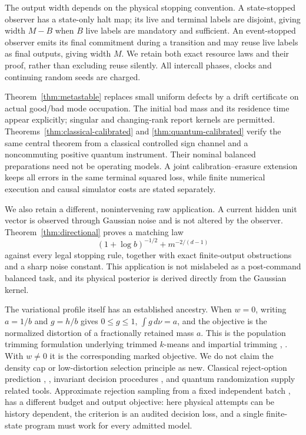 The output width depends on the physical stopping convention. A state-stopped observer has a state-only halt map; its live and terminal labels are disjoint, giving width $M-B$ when $B$ live labels are mandatory and sufficient. An event-stopped observer emits its final commitment during a transition and may reuse live labels as final outputs, giving width $M$. We retain both exact resource laws and their proof, rather than excluding reuse silently. All intercall phases, clocks and continuing random seeds are charged.

Theorem~\ref{thm:metastable} replaces small uniform defects by a drift certificate on actual good/bad mode occupation. The initial bad mass and its residence time appear explicitly; singular and changing-rank report kernels are permitted. Theorems~\ref{thm:classical-calibrated} and \ref{thm:quantum-calibrated} verify the same central theorem from a classical controlled sign channel and a noncommuting positive quantum instrument. Their nominal balanced preparations need not be operating models. A joint calibration--erasure extension keeps all errors in the same terminal squared loss, while finite numerical execution and causal simulator costs are stated separately.

We also retain a different, nonintervening raw application. A current hidden unit vector is observed through Gaussian noise and is not altered by the observer. Theorem~\ref{thm:directional} proves a matching law
\[
 (1+\log b)^{-1/2}+m^{-2/(d-1)}
\]
against every legal stopping rule, together with exact finite-output obstructions and a sharp noise constant. This application is not mislabeled as a post-command balanced task, and its physical posterior is derived directly from the Gaussian kernel.

The variational profile itself has an established ancestry. When $w=0$, writing $a=1/b$ and $g=h/b$ gives $0\le g\le1$, $\int g\,d\nu=a$, and the objective is the normalized distortion of a fractionally retained mass $a$. This is the population trimming formulation underlying trimmed $k$-means and impartial trimming \cite{CGM97}, \cite{GG99}. With $w\ne0$ it is the corresponding marked objective. We do not claim the density cap or low-distortion selection principle as new. Classical reject-option prediction \cite{Chow}, \cite{DHZ}, invariant decision procedures \cite{Luschgy}, and quantum randomization \cite{AMTW} supply related tools. Approximate rejection sampling from a fixed independent batch \cite{BP23}, \cite{SPJ26} has a different budget and output objective: here physical attempts can be history dependent, the criterion is an audited decision loss, and a single finite-state program must work for every admitted model.

